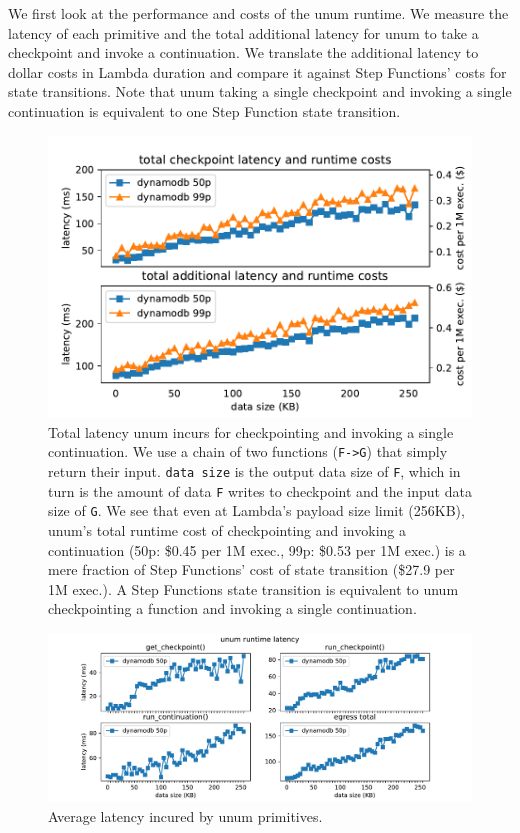 We first look at the performance and costs of the unum runtime. We measure the
latency of each primitive and the total additional latency for unum to take a
checkpoint and invoke a continuation. We translate the additional latency to
dollar costs in Lambda duration and compare it against Step Functions' costs
for state transitions. Note that unum taking a single checkpoint and invoking a
single continuation is equivalent to one Step Function state transition.

\begin{figure}[t!]
    \centering
    \includegraphics[width=\columnwidth]{figures/TotalAdditionalLatency.pdf}
    \caption{Total latency unum incurs for checkpointing and invoking a single
    continuation. We use a chain of two functions (\texttt{F->G}) that simply
    return their input. \texttt{data size} is the output data size of
    \texttt{F}, which in turn is the amount of data \texttt{F} writes to
    checkpoint and the input data size of \texttt{G}. We see that even at
    Lambda's payload size limit (256KB), unum's total runtime cost of
    checkpointing and invoking a continuation (50p: \$0.45 per 1M exec., 99p:
    \$0.53 per 1M exec.) is a mere fraction of Step Functions'
    cost of state transition (\$27.9 per 1M exec.). A Step Functions state
    transition is equivalent to unum checkpointing a function and invoking a
    single continuation.}
    \label{fig:totallatency}
\end{figure}

\begin{figure}[t!]
    \centering
    \includegraphics[width=\columnwidth]{figures/OpLatency.pdf}
    \caption{Average latency incured by unum primitives.}
    \label{fig:oplatency}
\end{figure}




